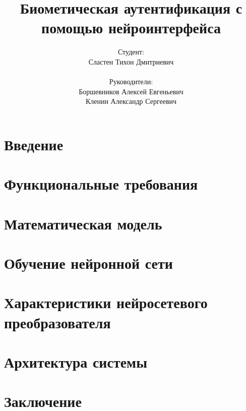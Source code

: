 \documentclass{beamer}
\title{Биометическая аутентификация с помощью нейроинтерфейса}
\author{
    Студент: \\ Сластен Тихон Дмитриевич \\ \\
    Руководители: \\ Боршевников Алексей Евгеньевич \\ Кленин Александр Сергеевич}
\institute{Б8303а Прикладная математика и информатика}
\date{}
\begin{document}
\maketitle

\section{Введение}





\section{Функциональные требования}



\section{Математическая модель}





\section{Обучение нейронной сети}



\section{Характеристики нейросетевого преобразователя}


\section{Архитектура системы}



\section{Заключение}

\end{document}
